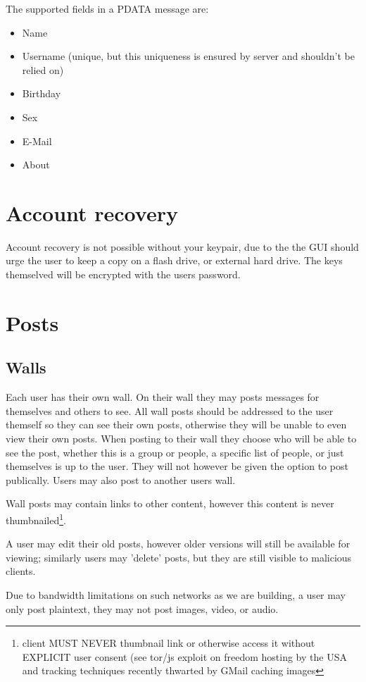 The supported fields in a PDATA message are:
    \begin{itemize}
        \item Name
        \item Username (unique, but this uniqueness is ensured by server and
              shouldn't be relied on)
        \item Birthday
        \item Sex
        \item E-Mail
        \item About
    \end{itemize}

\section{Account recovery}
Account recovery is not possible without your keypair, due to the the GUI should
urge the user to keep a copy on a flash drive, or external hard drive. The keys
themselved will be encrypted with the users password.

\section{Posts}
\subsection{Walls}
Each user has their own wall. On their wall they may posts messages for
themselves and others to see. All wall posts should be addressed to the user
themself so they can see their own posts, otherwise they will be unable to even
view their own posts. When posting to their wall they choose who will be able to
see the post, whether this is a group or people, a specific list of people, or
just themselves is up to the user. They will not however be given the option to
post publically. Users may also post to another users wall.

Wall posts may contain links to other content, however this content is never
thumbnailed\footnote{client MUST NEVER thumbnail link or otherwise access it
without EXPLICIT user consent (see tor/js exploit on freedom hosting by the USA
and tracking techniques recently thwarted by GMail caching images}.

A user may edit their old posts, however older versions will still be available
for viewing; similarly users may 'delete' posts, but they are still visible to
malicious clients.

Due to bandwidth limitations on such networks as we are building, a user may
only post plaintext, they may not post images, video, or audio.

